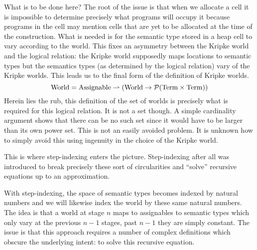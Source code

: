 What is to be done here? The root of the issue is that when we
allocate a cell it is impossible to determine precisely what programs
will occupy it because programs in the cell may mention cells that are
yet to be allocated at the time of the construction. What is needed is
for the semantic type stored in a heap cell to vary according to the
world. This fixes an asymmetry between the Kripke world and the
logical relation: the Kripke world supposedly maps locations to
semantic types but the semantics types (as determined by the logical
relation) vary of the Kripke worlds. This leads us to the final form
of the definition of Kripke worlds.
\[
  \mathrm{World} = \mathrm{Assignable} \rightharpoonup (\mathrm{World} \to \mathcal{P}(\mathrm{Term} \times \mathrm{Term}))
\]
Herein lies the rub, this definition of the set of worlds is precisely
what is required for this logical relation. It is not a set
though. A simple cardinality argument shows that there can be no such
set since it would have to be larger than its own power set. This is
not an easily avoided problem. It is unknown how to simply avoid this
using ingenuity in the choice of the Kripke world.

This is where step-indexing enters the picture. Step-indexing after
all was introduced to break precisely these sort of circularities and
``solve'' recursive equations up to an approximation.

With step-indexing, the space of semantic types becomes indexed by
natural numbers and we will likewise index the world by these same
natural numbers. The idea is that a world at stage $n$ maps to
assignables to semantic types which only vary at the previous $n - 1$
stages, past $n - 1$ they are simply constant. The issue is that this
approach requires a number of complex definitions which obscure the
underlying intent: to solve this recursive equation.

